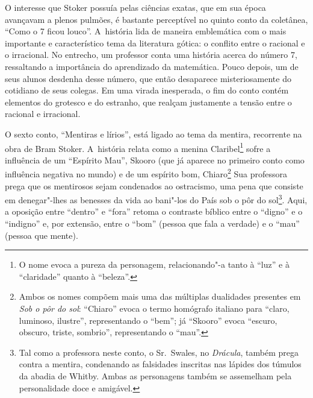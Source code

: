 O interesse que Stoker possuía pelas ciências exatas, que em sua época
avançavam a plenos pulmões, é bastante perceptível no quinto conto da
coletânea, ``Como o 7 ficou louco''. A~história lida de maneira
emblemática com o mais importante e característico tema da literatura
gótica: o conflito entre o racional e o irracional. No entrecho, um
professor conta uma história acerca do número 7, ressaltando a
importância do aprendizado da matemática. Pouco depois, um de seus
alunos desdenha desse número, que então desaparece misteriosamente do cotidiano
de seus colegas. Em uma virada inesperada, o fim do conto contém
elementos do grotesco e do estranho, que realçam justamente a tensão
entre o racional e irracional.

O sexto conto, ``Mentiras e lírios'', está ligado ao tema da mentira,
recorrente na obra de Bram Stoker. A~história relata como a menina
Claribel\footnote{O nome evoca a pureza da personagem,
relacionando"-a tanto à ``luz'' e à ``claridade'' quanto à ``beleza''.} sofre a influência de um ``Espírito
Mau'', Skooro (que já aparece no primeiro conto como influência negativa
no mundo) e de um espírito bom, Chiaro\footnote{Ambos os nomes compõem mais uma das
múltiplas dualidades presentes em \emph{Sob o pôr do sol}: ``Chiaro''
evoca o termo homógrafo italiano para ``claro, luminoso, ilustre'',
representando o ``bem''; já ``Skooro'' evoca ``escuro, obscuro, triste,
sombrio'', representando o ``mau''.}
Sua professora prega que os mentirosos sejam condenados ao ostracismo, uma
pena que consiste em denegar"-lhes as benesses da vida ao bani"-los do
País sob o pôr do sol\footnote{Tal como a professora neste conto, o Sr.~Swales, no \emph{Drácula}, também prega contra a mentira, condenando as
falsidades inscritas nas lápides dos túmulos da abadia de Whitby. Ambas
as personagens também se assemelham pela personalidade doce e amigável.}. Aqui, a oposição entre
``dentro'' e ``fora'' retoma o contraste bíblico entre o ``digno'' e o
``indigno'' e, por extensão, entre o ``bom'' (pessoa que fala a verdade)
e o ``mau'' (pessoa que mente).


